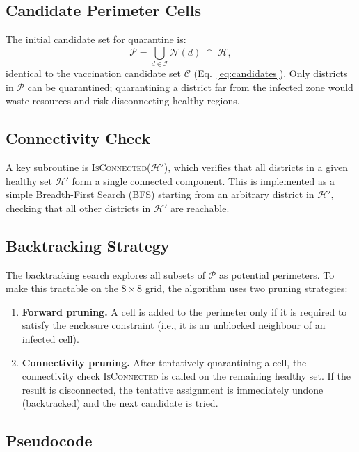 \documentclass[conference]{IEEEtran}
\begin{document}
\subsection{Candidate Perimeter Cells}

The initial candidate set for quarantine is:
\begin{equation}
  \mathcal{P} = \bigcup_{d \in \mathcal{I}} \mathcal{N}(d) \;\cap\; \mathcal{H},
\end{equation}
identical to the vaccination candidate set $\mathcal{C}$ (Eq.~\eqref{eq:candidates}).
Only districts in $\mathcal{P}$ can be quarantined; quarantining a district far from
the infected zone would waste resources and risk disconnecting healthy regions.

\subsection{Connectivity Check}

A key subroutine is \textsc{IsConnected}($\mathcal{H}'$), which verifies that all
districts in a given healthy set $\mathcal{H}'$ form a single connected component.
This is implemented as a simple Breadth-First Search (BFS) starting from an
arbitrary district in $\mathcal{H}'$, checking that all other districts in
$\mathcal{H}'$ are reachable.

\subsection{Backtracking Strategy}

The backtracking search explores all subsets of $\mathcal{P}$ as potential perimeters.
To make this tractable on the $8\times8$ grid, the algorithm uses two pruning strategies:

\begin{enumerate}
  \item \textbf{Forward pruning.} A cell is added to the perimeter only if it is
        required to satisfy the enclosure constraint (i.e., it is an unblocked
        neighbour of an infected cell).
  \item \textbf{Connectivity pruning.} After tentatively quarantining a cell,
        the connectivity check \textsc{IsConnected} is called on the remaining
        healthy set. If the result is disconnected, the tentative assignment is
        immediately undone (backtracked) and the next candidate is tried.
\end{enumerate}

\subsection{Pseudocode}
\end{document}
